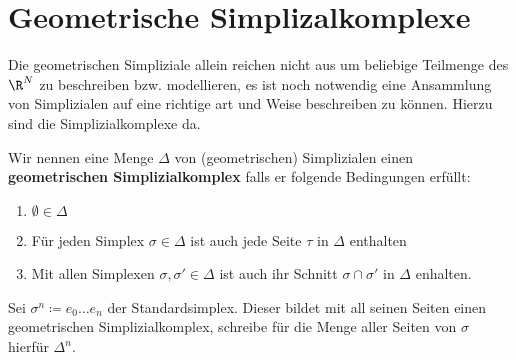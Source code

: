 
\section{Geometrische Simplizalkomplexe}

Die geometrischen Simpliziale allein reichen nicht aus um beliebige 
Teilmenge des $\R^N$ zu beschreiben bzw. modellieren, es ist noch notwendig eine Ansammlung von Simplizialen auf eine richtige art und Weise beschreiben zu können. Hierzu sind die Simplizialkomplexe da.

\begin{Def}
	Wir nennen eine Menge $\Delta$ von (geometrischen) Simplizialen einen \textbf{geometrischen Simplizialkomplex}
	falls er folgende Bedingungen erfüllt:
	\begin{enumerate}[(K1)]
		\item $\emptyset \in \Delta$
		\item Für jeden Simplex $\sigma \in \Delta$ ist auch jede Seite
		$\tau$ in $\Delta$ enthalten
		\item Mit allen Simplexen $\sigma, \sigma' \in \Delta$ ist auch ihr
		Schnitt $\sigma \cap \sigma'$ in $\Delta$ enhalten.
	\end{enumerate}
\end{Def}

\begin{Bsp}
	\item Sei $\sigma^n \coloneqq  e_0 \ldots e_n $ der Standardsimplex.
		Dieser bildet mit all seinen Seiten einen geometrischen Simplizialkomplex, schreibe für die Menge aller Seiten von $\sigma$ hierfür $\Delta^n$.
\end{Bsp}



